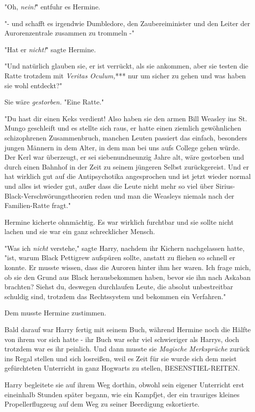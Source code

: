 {"Oh, \emph{nein!}" entfuhr es Hermine.

"- und schafft es irgendwie Dumbledore, den Zaubereiminister und den Leiter der Aurorenzentrale zusammen zu trommeln -"

"Hat er \emph{nicht!}" sagte Hermine.

"Und natürlich glauben sie, er ist verrückt, als sie ankommen, aber sie testen die Ratte trotzdem mit \emph{Veritas Oculum,}*** nur um sicher zu gehen und was haben sie wohl entdeckt?"

Sie wäre \emph{gestorben.} "Eine Ratte."

"Du hast dir einen Keks verdient! Also haben sie den armen Bill Weasley ins St. Mungo geschleift und es stellte sich raus, er hatte einen ziemlich gewöhnlichen schizophrenen Zusammenbruch, manchen Leuten passiert das einfach, besonders jungen Männern in dem Alter, in dem man bei uns aufs College gehen würde. Der Kerl war überzeugt, er sei siebenundneunzig Jahre alt, wäre gestorben und durch einen Bahnhof in der Zeit zu seinem jüngeren Selbst zurückgereist. Und er hat wirklich gut auf die Antipsychotika angesprochen und ist jetzt wieder normal und alles ist wieder gut, außer dass die Leute nicht mehr so viel über Sirius-Black-Verschwörungstheorien reden und man die Weasleys niemals nach der Familien-Ratte fragt."

Hermine kicherte ohnmächtig. Es war wirklich furchtbar und sie sollte nicht lachen und sie war ein ganz schrecklicher Mensch.

"Was ich \emph{nicht} verstehe," sagte Harry, nachdem ihr Kichern nachgelassen hatte, "ist, warum Black Pettigrew aufspüren sollte, anstatt zu fliehen so schnell er konnte. Er musste wissen, dass die Auroren hinter ihm her waren. Ich frage mich, ob sie den Grund aus Black herausbekommen haben, bevor sie ihn nach Askaban brachten? Siehst du, deswegen durchlaufen Leute, die absolut unbestreitbar schuldig sind, trotzdem das Rechtssystem und bekommen ein Verfahren."

Dem musste Hermine zustimmen.

Bald darauf war Harry fertig mit seinem Buch, während Hermine noch die Hälfte von ihrem vor sich hatte - ihr Buch war sehr viel schwieriger als Harrys, doch trotzdem war es ihr peinlich. Und dann musste sie \emph{Magische} \emph{Merksprüche} zurück ins Regal stellen und sich losreißen, weil es Zeit für sie wurde sich dem meist gefürchteten Unterricht in ganz Hogwarts zu stellen, BESENSTIEL-REITEN.

Harry begleitete sie auf ihrem Weg dorthin, obwohl sein eigener Unterricht erst eineinhalb Stunden später begann, wie ein Kampfjet, der ein trauriges kleines Propellerflugzeug auf dem Weg zu seiner Beerdigung eskortierte.

}
